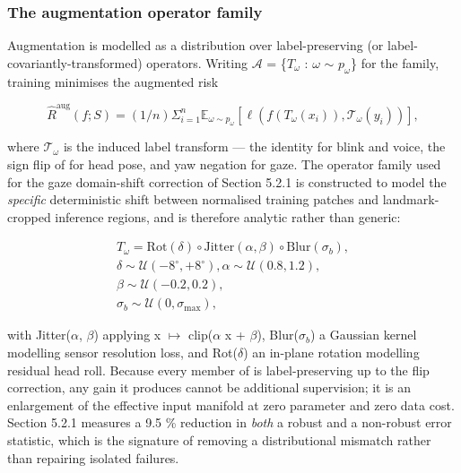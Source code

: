 \subsubsection{The augmentation operator family}

Augmentation is modelled as a distribution over label-preserving (or label-covariantly-transformed) operators. Writing $\mathcal{A}$ = \{$T_{\omega}$ : $\omega$ $\sim$ $p_{\omega}$\} for the family, training minimises the augmented risk

\begin{equation}
\label{eq:33}
\hat{R}^{\mathrm{aug}}(f ; S) = (1/n) \Sigma _{i=1}^{n} \mathbb{E}_{\omega \sim p_{\omega} } [ \ell ( f(T_{\omega} (x_{i})), \mathcal{T}_{\omega} (y_{i}) ) ] ,
\end{equation}

where $\mathcal{T}_{\omega}$ is the induced label transform --- the identity for blink and voice, the sign flip of  for head pose, and yaw negation for gaze. The operator family used for the gaze domain-shift correction of Section 5.2.1 is constructed to model the \emph{specific} deterministic shift between normalised training patches and landmark-cropped inference regions, and is therefore analytic rather than generic:

\begin{equation}
\label{eq:34}
\begin{aligned}
T_{\omega} = \mathrm{Rot}(\delta ) \circ \mathrm{Jitter}(\alpha , \beta ) \circ \mathrm{Blur}(\sigma _b) , \\
\delta \sim \mathcal{U}(-8^{\circ}, +8^{\circ}), \alpha \sim \mathcal{U}(0.8, 1.2), \\
\beta \sim \mathcal{U}(-0.2, 0.2), \\
\sigma _b \sim \mathcal{U}(0, \sigma _{\mathrm{max}}),
\end{aligned}
\end{equation}

with Jitter($\alpha$, $\beta$) applying x $\mapsto$ clip($\alpha$ x + $\beta$), Blur($\sigma_{b}$) a Gaussian kernel modelling sensor resolution loss, and Rot($\delta$) an in-plane rotation modelling residual head roll. Because every member of  is label-preserving up to the flip correction, any gain it produces cannot be additional supervision; it is an enlargement of the effective input manifold at zero parameter and zero data cost. Section 5.2.1 measures a 9.5 \% reduction in \emph{both} a robust and a non-robust error statistic, which is the signature of removing a distributional mismatch rather than repairing isolated failures.

